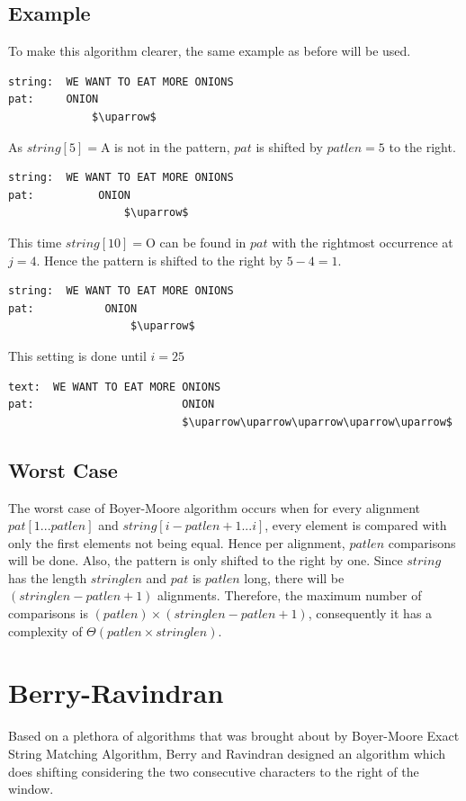 \subsection{Example}
To make this algorithm clearer, the same example as before will be used.
\begin{lstlisting}
string:  WE WANT TO EAT MORE ONIONS
pat:     ONION
             $\uparrow$
\end{lstlisting}

As $string[5]=$A is not in the pattern, $pat$ is shifted by $patlen=5$ to the right.

\begin{lstlisting}
string:  WE WANT TO EAT MORE ONIONS
pat:          ONION
                  $\uparrow$
\end{lstlisting}

This time $string[10]=$O can be found in $pat$ with the rightmost occurrence at $j=4$. Hence the pattern is shifted to the right by $5-4=1$.

\begin{lstlisting}
string:  WE WANT TO EAT MORE ONIONS
pat:           ONION
                   $\uparrow$
\end{lstlisting}

This setting is done until $i=25$

\begin{lstlisting}
text:  WE WANT TO EAT MORE ONIONS
pat:                       ONION
                           $\uparrow\uparrow\uparrow\uparrow\uparrow$
\end{lstlisting}

\subsection{Worst Case}
The worst case of Boyer-Moore algorithm occurs when for every alignment $pat[1...patlen]$ and $string[i-patlen+1...i]$, every element is compared with only the first elements not being equal. Hence per alignment, $patlen$ comparisons will be done. Also, the pattern is only shifted to the right by one. Since $string$ has the length $stringlen$ and $pat$ is $patlen$ long, there will be $(stringlen-patlen+1)$ alignments. Therefore, the maximum number of comparisons is $(patlen)\times(stringlen-patlen+1)$, consequently it has a complexity of $\Theta(patlen \times stringlen)$.


\section{Berry-Ravindran}
Based on a plethora of algorithms that was brought about by Boyer-Moore Exact String Matching Algorithm, Berry and Ravindran designed an algorithm which does shifting considering the two consecutive characters to the right of the window.
